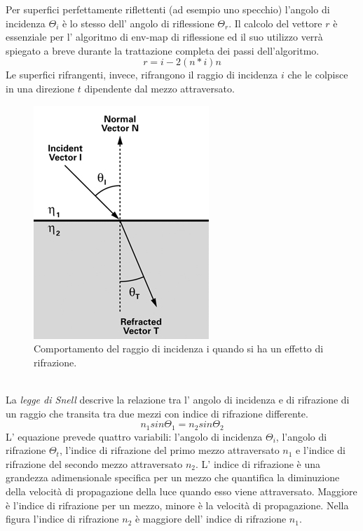 Per superfici perfettamente riflettenti (ad esempio uno specchio) l’angolo di incidenza $\Theta_i$ è lo stesso dell’ angolo di riflessione $\Theta_r$.
Il calcolo del vettore $r$ è essenziale per l’ algoritmo di env-map di riflessione ed il suo utilizzo verrà spiegato a breve durante la trattazione completa dei passi dell’algoritmo.
\begin{equation}
r = i - 2(n * i)n
\end{equation}
Le superfici rifrangenti, invece, rifrangono  il raggio di incidenza $i$ che le colpisce in una direzione $t$ dipendente dal mezzo attraversato.
\\
\begin{figure}[htb]
 \centering
 \includegraphics[width=0.4\linewidth]{images/chapter_stato_arte/stato_arte_refr.png}\hfill
 \caption[Env map: rifrazione]{Comportamento del raggio di incidenza i quando si ha un effetto di rifrazione.}
 \label{fig:stato_arte_refr}
\end{figure}
\\
La \emph{legge di Snell} descrive la relazione tra l’ angolo di incidenza e di rifrazione di un raggio che transita tra due mezzi con indice di rifrazione differente.
\begin{equation}
n_1sin\Theta_1 = n_2sin\Theta_2 
\end{equation}
L’ equazione prevede quattro variabili: l’angolo di incidenza $\Theta_i$, l’angolo di rifrazione $\Theta_t$, l’indice di rifrazione del primo mezzo attraversato $n_1$ e l’indice di rifrazione del secondo mezzo attraversato $n_2$.
L’ indice di rifrazione è una grandezza adimensionale specifica per un mezzo che quantifica la diminuzione della velocità di propagazione della luce quando esso viene attraversato. Maggiore è l’indice di rifrazione per un mezzo, minore è la velocità di propagazione.
Nella figura l’indice di rifrazione $n_2$ è maggiore dell’ indice di rifrazione $n_1$. 

